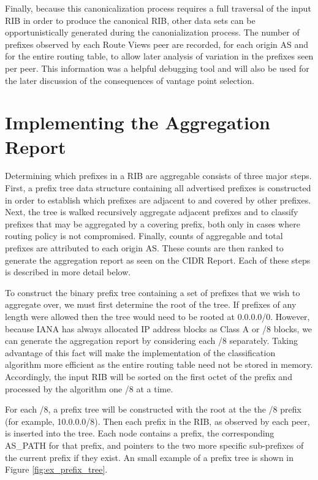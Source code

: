 Finally, because this canonicalization process requires a full traversal of the input RIB in order to produce the canonical RIB, other data sets can be opportunistically generated during the canonialization process. The number of prefixes observed by each Route Views peer are recorded, for each origin AS and for the entire routing table, to allow later analysis of variation in the prefixes seen per peer. This information was a helpful debugging tool and will also be used for the later discussion of the consequences of vantage point selection.

\section{Implementing the Aggregation Report}

Determining which prefixes in a RIB are aggregable consists of three major steps. First, a prefix tree data structure containing all advertised prefixes is constructed in order to establish which prefixes are adjacent to and covered by other prefixes. Next, the tree is walked recursively aggregate adjacent prefixes and to classify prefixes that may be aggregated by a covering prefix, both only in cases where routing policy is not compromised. Finally, counts of aggregable and total prefixes are attributed to each origin AS. These counts are then ranked to generate the aggregation report as seen on the CIDR Report. Each of these steps is described in more detail below.

To construct the binary prefix tree containing a set of prefixes that we wish to aggregate over, we must first determine the root of the tree. If prefixes of any length were allowed then the tree would need to be rooted at 0.0.0.0/0. However, because IANA has always allocated IP address blocks as Class A or /8 blocks, we can generate the aggregation report by considering each /8 separately. Taking advantage of this fact will make the implementation of the classification algorithm more efficient as the entire routing table need not be stored in memory. Accordingly, the input RIB will be sorted on the first octet of the prefix and processed by the algorithm one /8 at a time.

For each /8, a prefix tree will be constructed with the root at the the /8 prefix (for example, 10.0.0.0/8). Then each prefix in the RIB, as observed by each peer, is inserted into the tree. Each node contains a prefix, the corresponding AS\_PATH for that prefix, and pointers to the two more specific sub-prefixes of the current prefix if they exist. An small example of a prefix tree is shown in Figure \ref{fig:ex_prefix_tree}.

